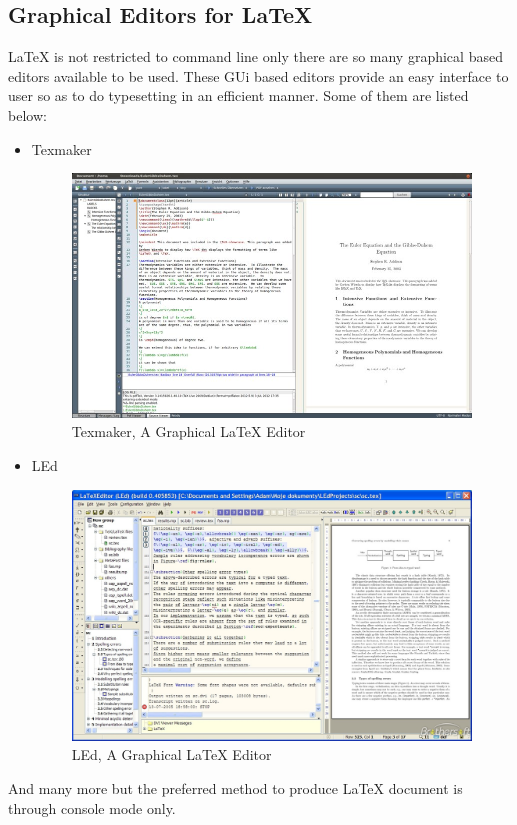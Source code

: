 \subsection{Graphical Editors for \LaTeX{}}
\LaTeX{} is not restricted to command line only there are so many graphical based editors available to be used. These GUi based editors provide an easy interface to user so as to do typesetting in an efficient manner. Some of them are listed below:
\begin{itemize}
\item {Texmaker}
\begin{figure}[ht]
\centering
\includegraphics[scale=0.4]{images/texmaker.png}
\caption{Texmaker, A Graphical \LaTeX{} Editor}
\end{figure}
\item LEd
\begin{figure}[ht]
\centering
\includegraphics[scale=0.2]{images/led.png}
\caption{LEd, A Graphical \LaTeX{} Editor}
\end{figure}
\end{itemize}
And many more but the preferred method to produce \LaTeX{} document is through console mode only.


